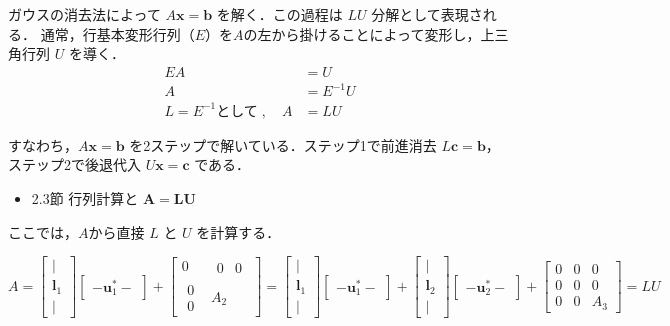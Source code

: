 \documentclass[letterpaper]{article}
\begin{document}
ガウスの消去法によって $A\bm{x}=\bm{b}$ を解く．この過程は $LU$ 分解として表現される．
通常，行基本変形行列（$E$）を$A$の左から掛けることによって変形し，上三角行列 $U$ を導く．
\begin{align*}
  EA &= U\\
  A &= E^{-1}U\\
L = E^{-1} \text{として} \; , \quad  A &= LU
\end{align*}

すなわち，$A\bm{x}=\bm{b}$ を2ステップで解いている．ステップ1で前進消去 $L\bm{c}=\bm{b}$，ステップ2で後退代入 $U\bm{x}=\bm{c}$ である．

\begin{itemize}
  \item 2.3節 行列計算と $\bm{A=LU}$
\end{itemize}

ここでは，$A$から直接 $L$ と $U$ を計算する．

\begin{equation*}
  A = 
      \begin{bmatrix}
        |\\
        \bm{l}_1\\
        |
      \end{bmatrix}
      \begin{bmatrix}
        -  \bm{u}^*_1  -
      \end{bmatrix}
  +  \begin{bmatrix}
      0 & \begin{matrix} 0 & 0 \end{matrix}\\
      \begin{matrix} 0 \\ 0 \end{matrix} & A_2
    \end{bmatrix}
  = 
  \begin{bmatrix}
    |\\
    \bm{l}_1\\
    |
  \end{bmatrix}
  \begin{bmatrix}
    - \bm{u}^*_1 -
  \end{bmatrix}
  +
  \begin{bmatrix}
    |\\
    \bm{l}_2\\
    |
  \end{bmatrix}
  \begin{bmatrix}
    - \bm{u}^*_2  -
  \end{bmatrix}
  +  \begin{bmatrix}
  0 & 0 & 0\\
  0 & 0 & 0 \\
  0 & 0 & A_3
  \end{bmatrix} = LU
\end{equation*}
 
\end{document}

